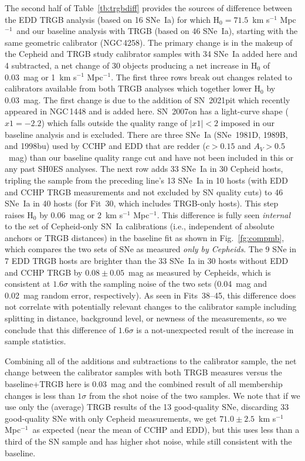 \documentclass[12pt]{aastex631}
\newcommand{\kms}{km s$^{-1}$ Mpc$^{-1}$}
\newcommand{\kmss }{km s$^{-1}$ Mpc$^{-1}$\ }
\begin{document}
The second half of Table~\ref{tb:trgbdiff} provides the sources of difference between the EDD TRGB analysis (based on 16 SNe~Ia) for which H$_0 = 71.5$~\kmss and our baseline analysis with TRGB (based on 46 SNe~Ia), starting with the same geometric calibrator (NGC$\,$4258).  The primary change is in the makeup of the Cepheid and TRGB study calibrator samples with 34 SNe~Ia added here and 4 subtracted, a net change of 30 objects producing a net increase in H$_0$ of 0.03~mag or 1~\kms.   The first three rows break out changes related to calibrators available from both TRGB analyses which together lower H$_0$ by 0.03~mag.  The first change is due to the addition of SN~2021pit which recently appeared in NGC$\,$1448 and is added here.  SN~2007on has a light-curve shape ($x1=-2.2$) which falls outside the quality range of $|x1| < 2$ imposed in our baseline analysis and is excluded.  There are three SNe~Ia (SNe~1981D, 1989B, and 1998bu) used by CCHP and EDD that are redder ($c>0.15$ and $A_V>0.5$~mag) than our baseline quality range cut and have not been included in this or any past SH0ES analyses.  The next row adds 33 SNe~Ia in 30 Cepheid hosts, tripling the sample  from the preceding line's 13 SNe~Ia in 10 hosts (with EDD and CCHP TRGB measurements and not excluded by SN quality cuts) to 46 SNe~Ia in 40 hosts (for Fit~30, which includes TRGB-only hosts). This step raises H$_0$ by 0.06~mag or 2~\kms.  This difference is fully seen {\it internal} to the set of Cepheid-only SN~Ia calibrations (i.e., independent of absolute anchors or TRGB distances) in the baseline fit as shown in Fig.~\ref{fg:compmb}, which compares the two sets of SNe as measured {\it only by Cepheids}.   The 9 SNe in 7 EDD TRGB hosts are brighter than the 33 SNe~Ia in 30 hosts without EDD and CCHP TRGB by $0.08\pm0.05$~mag as measured by Cepheids, which is consistent at $1.6\sigma$ with the sampling noise of the two sets (0.04~mag and 0.02~mag random error, respectively). As seen in Fits~38--45, this difference does not correlate with potentially relevant changes to the calibrator sample including splitting in distance, background level, or newness of the measurements, so we conclude that this difference of $1.6\sigma$ is a not-unexpected result of the increase in sample statistics.

Combining all of the additions and subtractions to the calibrator sample, the net change between the calibrator samples with both TRGB measures versus the baseline+TRGB here is 0.03~mag and the combined result of all membership changes is less than $1\sigma$ from the shot noise of the two samples.  We note that if we use only the (average) TRGB results of the 13 good-quality SNe, discarding 33 good-quality SNe with only Cepheid measurements, we get $71.0 \pm 2.5$~\kmss as expected (near the mean of CCHP and EDD), but this uses less than a third of the SN sample and has higher shot noise, while still consistent with the baseline.
\end{document}
